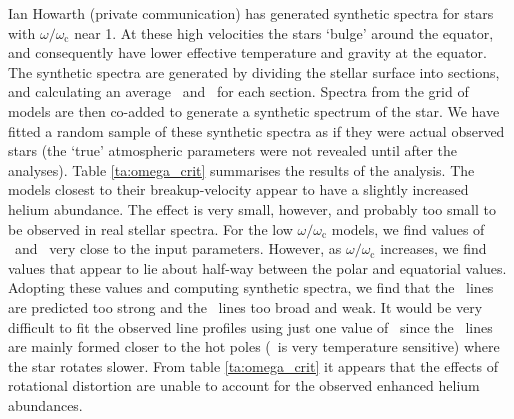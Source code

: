 Ian Howarth (private communication) has generated synthetic spectra
for stars with $\omega/\omega_\mathrm{c}$ near 1. At these high
velocities the stars `bulge' around the equator, and consequently have
lower effective temperature and gravity at the equator. The synthetic
spectra are generated by dividing the stellar surface into sections,
and calculating an average \teff\ and \logg\ for each section. Spectra
from the grid of models are then co-added to generate a synthetic
spectrum of the star. We have fitted a random sample of these
synthetic spectra as if they were actual observed stars (the `true'
atmospheric parameters were not revealed until after the
analyses). Table \ref{ta:omega_crit} summarises the results of the
analysis. The models closest to their breakup-velocity appear to have
a slightly increased helium abundance. The effect is very small,
however, and probably too small to be observed in real stellar
spectra. For the low $\omega/\omega_\mathrm{c}$ models, we find values
of \teff\ and \logg\ very close to the input parameters. However, as
$\omega/\omega_\mathrm{c}$ increases, we find values that appear to
lie about half-way between the polar and equatorial values. Adopting
these values and computing synthetic spectra, we find that the \hei\
lines are predicted too strong and the \heii\ lines too broad and
weak. It would be very difficult to fit the observed line profiles
using just one value of \vsini\ since the \hei\ lines are mainly
formed closer to the hot poles (\heii\ is very temperature sensitive)
where the star rotates slower. From table \ref{ta:omega_crit} it
appears that the effects of rotational distortion are unable to
account for the observed enhanced helium abundances.

